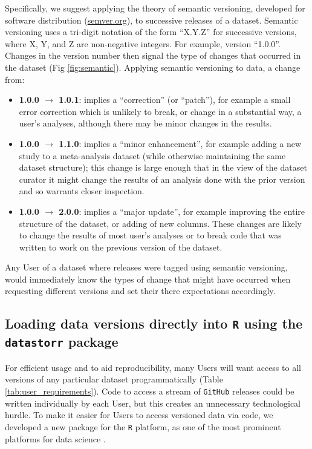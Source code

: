 \documentclass[a4paper,num-refs]{assets/oup-contemporary}
\begin{document}
Specifically, we suggest applying the theory of semantic versioning, developed for software distribution (\href{http://semver.org/}{semver.org}), to successive releases of a dataset. Semantic versioning uses a tri-digit notation of the form ``X.Y.Z'' for successive versions, where X, Y, and Z are non-negative integers. For example, version ``1.0.0''. Changes in the version number then signal the type of changes that occurred in the dataset (Fig \ref{fig:semantic}). Applying semantic versioning to data, a change from:
\begin{itemize}
  \item {\bf 1.0.0 $\rightarrow$ 1.0.1}: implies a ``correction'' (or ``patch''), for example a small error correction which is unlikely to break, or change in a substantial way, a user's analyses, although there may be minor changes in the results.
  \item {\bf 1.0.0 $\rightarrow$ 1.1.0}: implies a ``minor enhancement'', for example adding a new study to a meta-analysis dataset (while otherwise maintaining the same dataset structure); this change is large enough that in the view of the dataset curator it might change the results of an analysis done with the prior version and so warrants closer inspection.
  \item {\bf 1.0.0 $\rightarrow$ 2.0.0}: implies a ``major update'', for example improving the entire structure of the dataset, or adding of new columns. These changes are likely to change the results of most user's analyses or to break code that was written to work on the previous version of the dataset.
\end{itemize}
Any User of a dataset where releases were tagged using semantic versioning, would immediately know the types of change that might have occurred when requesting different versions and set their there expectations accordingly.


\subsection{Loading data versions directly into \texttt{R} using the \texttt{datastorr} package}

For efficient usage and to aid reproducibility, many Users will want access to all versions of any particular dataset programmatically (Table \ref{tab:user_requirements}). Code to access a stream of \texttt{GitHub} releases could be written individually by each User, but this creates an unnecessary technological hurdle. To make it easier for Users to access versioned data via code, we developed a new package for the \texttt{R} platform, as one of the most prominent platforms for data science \cite{R-2017}.
\end{document}
